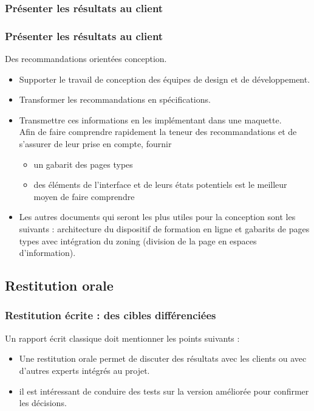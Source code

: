 \subsubsection{Présenter les résultats au client} 
		\begin{frame}[allowframebreaks]
		\frametitle{Présenter les résultats au client}
			Des recommandations orientées conception.
					\begin {itemize}
				      \item Supporter le travail de conception des équipes de design et de développement. 
				      \item Transformer les recommandations en spécifications.
				      \item Transmettre ces informations en les implémentant dans une maquette. \\ Afin de faire comprendre rapidement la teneur des recommandations et de s'assurer de leur prise en compte, fournir
				      		\begin {itemize}
				     		\item un gabarit des pages types
				     		\item des éléments de l'interface et de leurs états potentiels est le meilleur moyen de faire comprendre
				     		\end{itemize}
					\item Les autres documents qui seront les plus utiles pour la conception sont les suivants : architecture du dispositif de formation en ligne et gabarits de pages types avec intégration du zoning (division de la page en espaces d'information). 				      		
					\end{itemize}
				
		\end{frame}   
		
		 	\subsection{Restitution orale} 
		\begin{frame}[allowframebreaks]
		\frametitle{Restitution écrite : des cibles différenciées}
			Un rapport écrit classique doit mentionner les points suivants :
			\begin {itemize}
			\item Une restitution orale permet de discuter des résultats avec les clients ou avec d'autres experts intégrés au projet.
			\item il est intéressant de conduire des tests sur la version améliorée pour confirmer les décisions.
			\end{itemize}
		\end{frame}    	
	 		
